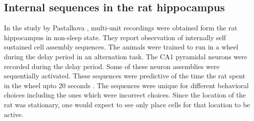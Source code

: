 \subsection{Internal sequences in the rat hippocampus}
In the study by Pastalkova \cite{Pastalkova2008a}, multi-unit recordings were obtained form the rat hippocampus in non-sleep state. They report observation of internally self sustained cell assembly sequences. The animals were trained to run in a wheel during the delay period in an alternation task. The CA1 pyramidal neurons were recorded during the delay period. Some of these neuron assemblies were sequentially activated. These sequences were predictive of the time the rat spent in the wheel upto 20 seconds \cite{Itskov2011a}. The sequences were unique for different behavioral choices including the ones which were incorrect choices. Since the location of the rat was stationary, one would expect to see only place cells for that location to be active.  \\  
[time/distance cells]
